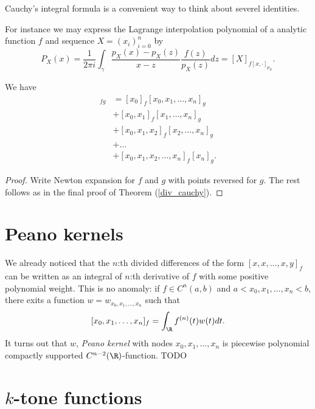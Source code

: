 Cauchy's integral formula is a convenient way to think about severel identities.

\begin{esim}
For instance we may express the Lagrange interpolation polynomial of a analytic function $f$ and sequence $X = (x_{i})_{i = 0}^{n}$ by
\[
	P_{X}(x) = \frac{1}{2 \pi i} \int_{\gamma} \frac{p_{X}(x) - p_{X}(z)}{x - z}\frac{f(z)}{p_{X}(z)} dz = [X]_{f [x, \cdot]_{p_{X}}}.
\]
\end{esim}

\begin{prop}
	We have
	\begin{align*}
		[x_{0}, x_{1}, \ldots, x_{n}]_{f g} &= [x_{0}]_{f} [x_{0}, x_{1}, \ldots, x_{n}]_{g} \\
		&+ [x_{0}, x_{1}]_{f} [x_{1}, \ldots, x_{n}]_{g} \\
		&+ [x_{0}, x_{1}, x_{2}]_{f} [x_{2}, \ldots, x_{n}]_{g} \\
		&+ \ldots \\
		&+ [x_{0}, x_{1}, x_{2}, \ldots, x_{n}]_{f} [x_{n}]_{g}.
	\end{align*}
\end{prop}
\begin{proof}
	Write Newton expansion for $f$ and $g$ with points reversed for $g$. The rest follows as in the final proof of Theorem (\ref{div_cauchy}).
\end{proof}

\section{Peano kernels}

We already noticed that the $n$:th divided differences of the form $[x, x, \ldots, x, y]_{f}$ can be written as an integral of $n$:th derivative of $f$ with some positive polynomial weight. This is no anomaly: if $f \in C^{n}(a, b)$ and $a < x_{0}, x_{1}, \ldots, x_{n} < b$, there exits a function $w = w_{x_{0}, x_{1}, \ldots, x_{n}}$ such that
\[
	[x_{0}, x_{1}, \ldots, x_{n}]_{f} = \int_{\R} f^{(n)}(t) w(t) dt.
\]
It turns out that $w$, \textit{Peano kernel} with nodes $x_{0}, x_{1}, \ldots, x_{n}$ is piecewise polynomial compactly supported $C^{n - 2}(\R)$-function. TODO

\section{$k$-tone functions}

